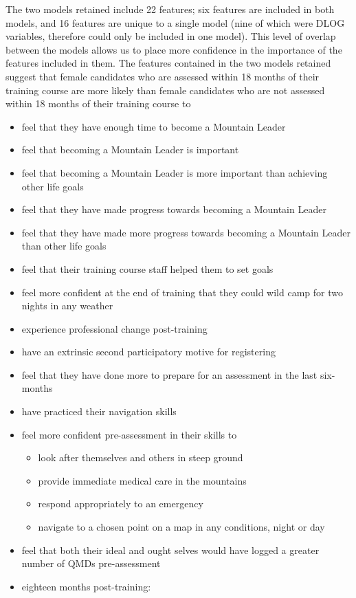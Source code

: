 \documentclass[
  12pt,
  a4paper,
]{book}
\providecommand{\tightlist}{%
  \setlength{\itemsep}{0pt}\setlength{\parskip}{0pt}}
\begin{document}
The two models retained include 22 features; six features are included in both models, and 16 features are unique to a single model (nine of which were DLOG variables, therefore could only be included in one model). This level of overlap between the models allows us to place more confidence in the importance of the features included in them. The features contained in the two models retained suggest that female candidates who are assessed within 18 months of their training course are more likely than female candidates who are not assessed within 18 months of their training course to

\begin{itemize}
\tightlist
\item
  feel that they have enough time to become a Mountain Leader
\item
  feel that becoming a Mountain Leader is important
\item
  feel that becoming a Mountain Leader is more important than achieving other life goals
\item
  feel that they have made progress towards becoming a Mountain Leader
\item
  feel that they have made more progress towards becoming a Mountain Leader than other life goals
\item
  feel that their training course staff helped them to set goals
\item
  feel more confident at the end of training that they could wild camp for two nights in any weather
\item
  experience professional change post-training
\item
  have an extrinsic second participatory motive for registering
\item
  feel that they have done more to prepare for an assessment in the last six-months
\item
  have practiced their navigation skills
\item
  feel more confident pre-assessment in their skills to

  \begin{itemize}
  \tightlist
  \item
    look after themselves and others in steep ground
  \item
    provide immediate medical care in the mountains
  \item
    respond appropriately to an emergency
  \item
    navigate to a chosen point on a map in any conditions, night or day
  \end{itemize}
\item
  feel that both their ideal and ought selves would have logged a greater number of QMDs pre-assessment
\item
  eighteen months post-training:


\end{itemize}
\end{document}
